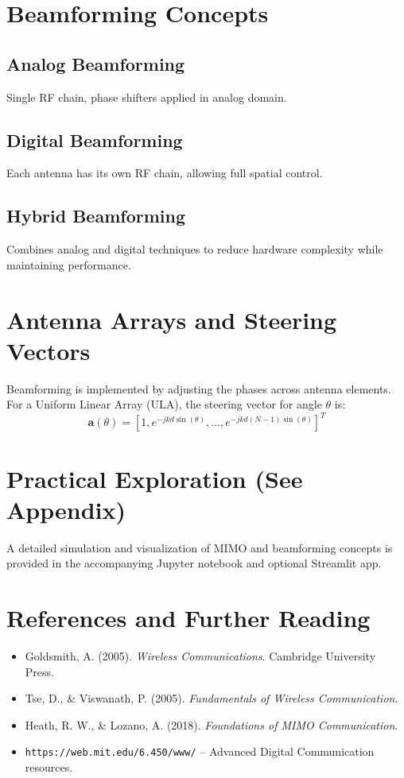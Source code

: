 \section{Beamforming Concepts}
\subsection{Analog Beamforming}
Single RF chain, phase shifters applied in analog domain.

\subsection{Digital Beamforming}
Each antenna has its own RF chain, allowing full spatial control.

\subsection{Hybrid Beamforming}
Combines analog and digital techniques to reduce hardware complexity while maintaining performance.

\section{Antenna Arrays and Steering Vectors}
Beamforming is implemented by adjusting the phases across antenna elements. For a Uniform Linear Array (ULA), the steering vector for angle $\theta$ is:
\[
\mathbf{a}(\theta) = \left[1, e^{-jkd\sin(\theta)}, \ldots, e^{-jkd(N-1)\sin(\theta)} \right]^T
\]

\section{Practical Exploration (See Appendix)}
A detailed simulation and visualization of MIMO and beamforming concepts is provided in the accompanying Jupyter notebook and optional Streamlit app.

\section{References and Further Reading}
\begin{itemize}
  \item Goldsmith, A. (2005). \textit{Wireless Communications}. Cambridge University Press.
  \item Tse, D., \& Viswanath, P. (2005). \textit{Fundamentals of Wireless Communication}.
  \item Heath, R. W., \& Lozano, A. (2018). \textit{Foundations of MIMO Communication}.
  \item \texttt{https://web.mit.edu/6.450/www/} – Advanced Digital Communication resources.
\end{itemize}

